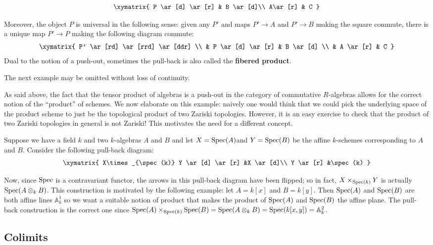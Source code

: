 \begin{proposition}
\begin{definition}
\[ \xymatrix {
P \ar[d] \ar[r] & B \ar[d]\\
A\ar[r] & C }\]

Moreover, the object $P$ is universal in the following sense: given any $P'$
and maps $P'\to A$ and $P'\to B$ making the square commute, there is a
unique map
$P'\to P$ making the following diagram commute:
\[
\xymatrix{
 P' \ar[rd] \ar[rrd] \ar[ddr] \\
& P \ar[d] \ar[r] &  B \ar[d] \\
& A \ar[r] &  C }\]
Dual to the notion of a push-out, sometimes the pull-back is also called the
\textbf{fibered product}.
\end{definition}

\begin{example} The next example may
be omitted without loss of continuity.

As said above, the fact that the tensor product of algebras is
a push-out in the category of
commutative $R$-algebras allows for the correct notion of the ``product'' of
schemes. We now elaborate on this example: naively one would think that we
could pick the underlying space of the product scheme to just be the topological
product of two Zariski topologies. However, it is an easy exercise to check
that the product of two Zariski topologies in general is not Zariski! This
motivates
the need for a different concept.

Suppose we have a field $k$ and two $k$-algebras $A$ and $B$ and let
$X=\operatorname{Spec}(A)$and $Y=\operatorname{Spec}(B)$ be the affine $k$-schemes corresponding to $A$ and
$B$. Consider the following pull-back diagram:
\[
\xymatrix{
X\times_{\spec(k)} Y \ar[d] \ar[r] &X \ar[d]\\
Y \ar[r] &\spec(k) }\]

Now, since $\operatorname{Spec}$ is a contravariant functor, the arrows in this pull-back
diagram have been flipped; so in fact, $X\times_{\operatorname{Spec}(k)} Y$ is actually
$\operatorname{Spec}(A\otimes _k B)$. This construction is motivated by the following example:
let $A=k[x]$ and $B=k[y]$. Then $\operatorname{Spec}(A)$ and $\operatorname{Spec}(B)$ are both affine lines
$\mathbb{A}^1_k$ so we want a suitable notion of product that makes the product
of $\operatorname{Spec}(A)$ and $\operatorname{Spec}(B)$ the affine plane. The pull-back construction is the
correct one since $\operatorname{Spec}(A)\times_{\operatorname{Spec}(k)} \operatorname{Spec}(B)=\operatorname{Spec}(A\otimes_k
B)=\operatorname{Spec}(k[x,y])=\mathbb{A}^2_k$.
\end{example}


\subsection{Colimits}



\end{proposition}
